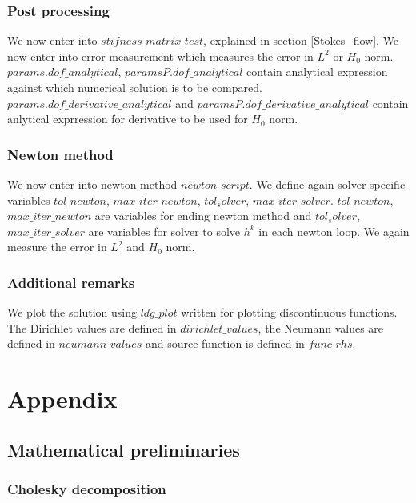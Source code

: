 \documentclass[a4paper,12pt]{book}
\begin{document}
\subsection{Post processing}

We now enter into $stifness\_matrix\_test$, explained in section \ref{Stokes_flow}. We now enter into error measurement which measures the error in $L^2$ or $H_0$ norm. $params.dof\_analytical$, $paramsP.dof\_analytical$ contain analytical expression against which numerical solution is to be compared. $params.dof\_derivative\_analytical$ and  $paramsP.dof\_derivative\_analytical$ contain anlytical exprression for derivative to be used for $H_0$ norm.\\

\subsection{Newton method}

We now enter into newton method $newton\_script$. We define again solver specific variables $tol\_newton$, $max\_iter\_newton$, $tol_solver$, $max\_iter\_solver$. $tol\_newton$, $max\_iter\_newton$ are variables for ending newton method and $tol_solver$, $max\_iter\_solver$ are variables for solver to solve $h^k$ in each newton loop. We again measure the error in $L^2$ and $H_0$ norm.\\

\subsection{Additional remarks}

We plot the solution using  $ldg\_plot$ written for plotting discontinuous functions. The Dirichlet values are defined in $dirichlet\_values$, the Neumann values are defined in $neumann\_values$ and source function is defined in $func\_rhs$. 

\chapter{Appendix}

\section{Mathematical preliminaries}

\subsection{Cholesky decomposition} \label{chol}
\end{document}
